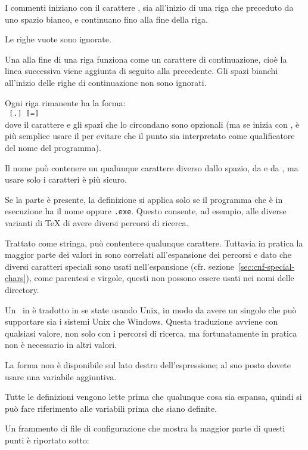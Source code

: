 \documentclass{article}
\begin{document}
\begin{itemize*}
\item
  I commenti iniziano con il carattere \code{\%}, sia all'inizio di una
  riga che preceduto da uno spazio bianco, e continuano fino alla fine
  della riga.
\item
  Le righe vuote sono ignorate.
\item
  Una \bs{} alla fine di una riga funziona come un carattere di
  continuazione, cioè la linea successiva viene aggiunta di seguito alla
  precedente. Gli spazi bianchi
  all'inizio delle righe di continuazione non sono ignorati.
\item
  Ogni riga rimanente ha la forma:\\
  \hspace*{2em}\texttt{ \textrm{[}.\textrm{]}
  \textrm{[}=\textrm{]} }\\[1pt]
  dove il carattere \samp{=} e gli spazi che lo circondano sono opzionali
  (ma se  inizia con , è più semplice usare il \samp{=}
  per evitare che il punto sia interpretato come qualificatore del nome
  del programma).
\item
  Il nome  può contenere un qualunque carattere diverso
  dallo spazio, da \samp{=} e da , ma usare solo i caratteri
   è più sicuro.
\item
  Se la parte  è presente, la definizione si
  applica solo se il programma che è in esecuzione ha il nome
  \texttt{} oppure \texttt{.exe}.
  Questo consente, ad esempio, alle diverse varianti di \TeX{} di avere
  diversi percorsi di ricerca.
\item Trattato come stringa,  può contentere qualunque
  carattere. Tuttavia in pratica la maggior parte dei valori in
   sono correlati all'espansione dei percorsi e dato che
  diversi caratteri speciali sono usati nell'espansione (cfr.
  sezione~\ref{sec:cnf-special-chars}), come parentesi e virgole, questi
  non possono essere usati nei nomi delle directory.

  Un \samp{;}\ in  è tradotto in \samp{:} se state usando
  Unix, in modo da avere un singolo  che può supportare
  sia i sistemi Unix che Windows. Questa traduzione avviene con qualsiasi
  valore, non solo con i percorsi di ricerca, ma fortunatamente in pratica
  \samp{;} non è necessario in altri valori.

  La forma  non è disponibile sul
  lato destro dell'espressione; al suo posto dovete usare una variabile
  aggiuntiva.

\item
  Tutte le definizioni vengono lette prima che qualunque cosa sia espansa,
  quindi si può fare riferimento alle variabili prima che siano definite.
\end{itemize*}
Un frammento di file di configurazione che mostra la maggior parte di
questi punti è
\ifSingleColumn
riportato sotto:
\end{document}
